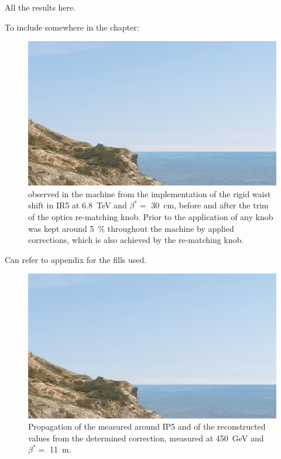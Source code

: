 All the results here.

To include somewhere in the chapter:

\begin{figure}[!thb]
    \centering
    \includegraphics*[width=\columnwidth]{Figures/placeholder.png}
    \caption{\betabeating observed in the machine from the implementation of the rigid waist shift in IR5 at \qty{6.8}{\tera\electronvolt} and \(\beta^{*}=\) \qty{30}{\centi\meter}, before and after the trim of the optics re-matching knob. Prior to the application of any knob \betabeating was kept around \qty{5}{\percent} throughout the machine by applied corrections, which is also achieved by the re-matching knob.}
    \label{fig:ir5_rws_rematching}
\end{figure}

Can refer to appendix  for the fills used.

\begin{figure}[!htb]
    \centering
    \includegraphics*[width=\columnwidth]{Figures/placeholder.png}
    \caption{Propagation of the measured \absfoneohone around IP5 and of the reconstructed values from the determined correction, measured at \qty{450}{\giga\electronvolt} and \(\beta^{*}=\) \qty{11}{\meter}.}
    \label{fig:beamtest_sbs_abs_f1001_ip5}
\end{figure}

